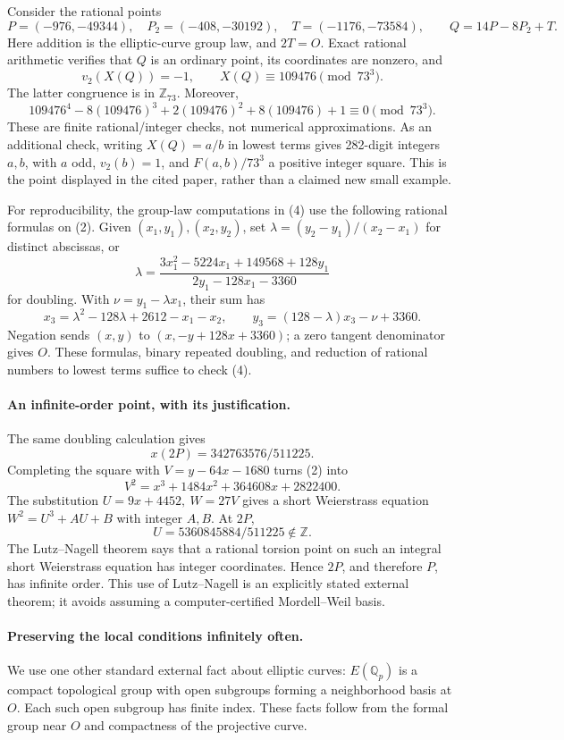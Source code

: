 Consider the rational points
\[
 P=(-976,-49344),\quad P_2=(-408,-30192),\quad
 T=(-1176,-73584),\qquad Q=14P-8P_2+T.
\]
Here addition is the elliptic-curve group law, and \(2T=O\). Exact rational arithmetic verifies that \(Q\) is an ordinary point, its coordinates are nonzero, and
\[
 v_2(X(Q))=-1,\qquad
 X(Q)\equiv109476\pmod{73^3}. \tag{4}
\]
The latter congruence is in \(\mathbb Z_{73}\). Moreover,
\[
 109476^4-8(109476)^3+2(109476)^2+8(109476)+1
 \equiv0\pmod{73^3}. \tag{5}
\]
These are finite rational/integer checks, not numerical approximations. As an additional check, writing \(X(Q)=a/b\) in lowest terms gives 282-digit integers \(a,b\), with \(a\) odd, \(v_2(b)=1\), and \(F(a,b)/73^3\) a positive integer square. This is the point displayed in the cited paper, rather than a claimed new small example.

For reproducibility, the group-law computations in (4) use the following rational formulas on (2). Given \((x_1,y_1),(x_2,y_2)\), set
\(\lambda=(y_2-y_1)/(x_2-x_1)\) for distinct abscissas, or
\[
 \lambda=\frac{3x_1^2-5224x_1+149568+128y_1}
                    {2y_1-128x_1-3360}
\]
for doubling. With \(\nu=y_1-\lambda x_1\), their sum has
\[
 x_3=\lambda^2-128\lambda+2612-x_1-x_2,
 \qquad y_3=(128-\lambda)x_3-\nu+3360.
\]
Negation sends \((x,y)\) to \((x,-y+128x+3360)\); a zero tangent denominator gives \(O\). These formulas, binary repeated doubling, and reduction of rational numbers to lowest terms suffice to check (4).

\paragraph{An infinite-order point, with its justification.}
The same doubling calculation gives
\[
 x(2P)=342763576/511225.
\]
Completing the square with \(V=y-64x-1680\) turns (2) into
\[
 V^2=x^3+1484x^2+364608x+2822400.
\]
The substitution \(U=9x+4452,\ W=27V\) gives a short Weierstrass equation \(W^2=U^3+AU+B\) with integer \(A,B\). At \(2P\),
\[
 U=5360845884/511225\notin\mathbb Z.
\]
The Lutz--Nagell theorem says that a rational torsion point on such an integral short Weierstrass equation has integer coordinates. Hence \(2P\), and therefore \(P\), has infinite order. This use of Lutz--Nagell is an explicitly stated external theorem; it avoids assuming a computer-certified Mordell--Weil basis.

\paragraph{Preserving the local conditions infinitely often.}
We use one other standard external fact about elliptic curves: \(E(\mathbb Q_p)\) is a compact topological group with open subgroups forming a neighborhood basis at \(O\). Each such open subgroup has finite index. These facts follow from the formal group near \(O\) and compactness of the projective curve.

